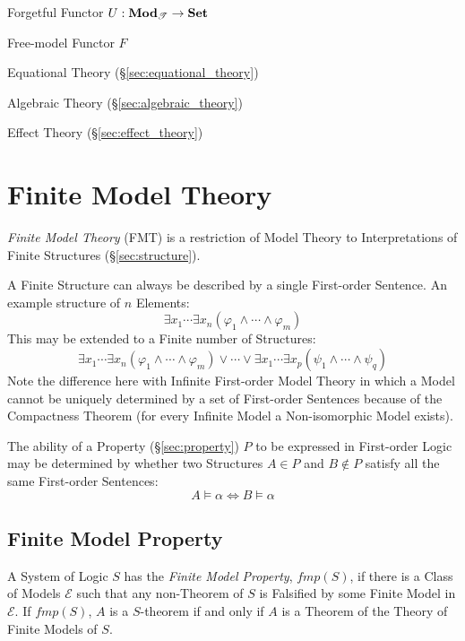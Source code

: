 Forgetful Functor $U : \mathbf{Mod}_\mathscr{T} \rightarrow \mathbf{Set}$

Free-model Functor $F$

Equational Theory (\S\ref{sec:equational_theory})

Algebraic Theory (\S\ref{sec:algebraic_theory})

Effect Theory (\S\ref{sec:effect_theory})



\section{Finite Model Theory}\label{sec:finite_model}

\emph{Finite Model Theory} (FMT) is a restriction of Model Theory to
Interpretations of Finite Structures (\S\ref{sec:structure}).

A Finite Structure can always be described by a single First-order
Sentence. An example structure of $n$ Elements:
\[
  \exists x_1 \cdots \exists x_n ( \varphi_1 \wedge \cdots \wedge
  \varphi_m )
\]
This may be extended to a Finite number of Structures:
\[
  \exists x_1 \cdots \exists x_n ( \varphi_1 \wedge \cdots \wedge
  \varphi_m )
  \vee
  \cdots
  \vee
  \exists x_1 \cdots \exists x_p ( \psi_1 \wedge \cdots \wedge
  \psi_q )
\]
Note the difference here with Infinite First-order Model Theory in
which a Model cannot be uniquely determined by a set of First-order
Sentences because of the Compactness Theorem (for every Infinite Model
a Non-isomorphic Model exists).

The ability of a Property (\S\ref{sec:property}) $P$ to be expressed
in First-order Logic may be determined by whether two Structures $A
\in P$ and $B \notin P$ satisfy all the same First-order Sentences:
\[
  A \models \alpha \Leftrightarrow B \models \alpha
\]



\subsection{Finite Model Property}\label{sec:finite_model_property}

A System of Logic $S$ has the \emph{Finite Model Property}, $fmp(S)$,
if there is a Class of Models $\mathcal{E}$ such that any non-Theorem
of $S$ is Falsified by some Finite Model in $\mathcal{E}$. If
$fmp(S)$, $A$ is a $S$-theorem if and only if $A$ is a Theorem of the
Theory of Finite Models of $S$.


